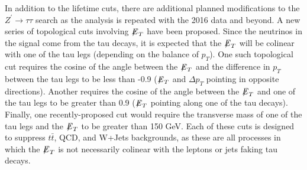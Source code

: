 In addition to the lifetime cuts, there are additional planned modifications to the $Z^\prime\to\tau\tau$ search as the analysis is repeated with the 2016 data and beyond. A new series of topological cuts involving ${\not\mathrel{E}}_T$ have been proposed. Since the neutrinos in the signal come from the tau decays, it is expected that the ${\not\mathrel{E}}_T$ will be colinear with one of the tau legs (depending on the balance of $p_T$). One such topological cut requires the cosine of the angle between the ${\not\mathrel{E}}_T$ and the difference in $p_T$ between the tau legs to be less than -0.9 (${\not\mathrel{E}}_T$ and $\Delta p_T$ pointing in opposite directions). Another requires the cosine of the angle between the ${\not\mathrel{E}}_T$ and one of the tau legs to be greater than 0.9 (${\not\mathrel{E}}_T$ pointing along one of the tau decays). Finally, one recently-proposed cut would require the transverse mass of one of the tau legs and the ${\not\mathrel{E}}_T$ to be greater than 150 GeV. Each of these cuts is designed to suppress $t\bar{t}$, QCD, and W+Jets backgrounds, as these are all processes in which the ${\not\mathrel{E}}_T$ is not necessarily colinear with the leptons or jets faking tau decays. 